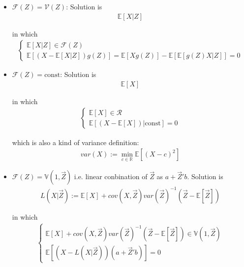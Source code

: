 \begin{itemize}[topsep=2pt,itemsep=0pt]
    \item $ \mathscr{F}(Z)=\mathscr{V}(Z) $: Solution is 
    \begin{align}
        \mathbb{E}\left[ X|Z \right] 
    \end{align}
    
    in which
    \begin{align}
        \begin{cases}
            \mathbb{E}\left[ X|Z \right] \in\mathscr{F}(Z)\\
            \mathbb{E}\left[(X-\mathbb{E}\left[ X|Z \right] )g(Z) \right]=\mathbb{E}\left[ Xg(Z) \right] -\mathbb{E}\left[ \mathbb{E}\left[ g(Z)X|Z \right]  \right] =0 
        \end{cases} 
    \end{align}
    \item $ \mathscr{F}(Z)=\mathrm{const} $: Solution is
    \begin{align}
         \mathbb{E}\left[ X \right]  
    \end{align}
    
    in which
    \begin{align}
        \begin{cases}
            \mathbb{E}\left[ X \right]\in \mathcal{R}\\
            \mathbb{E}\left[ (X-\mathbb{E}\left[ X \right] )\big| \mathrm{const} \right]=0 
        \end{cases} 
    \end{align}

    which is also a kind of variance definition:
    \begin{align}
        var(X):=\min_{c\in\mathbb{R}}\mathbb{E}\left[ (X-c)^2 \right]  
    \end{align}
    
    \item \hypertarget{MMSELinear}{}$ \mathscr{F}(Z)=\mathbb{V}(1,\vec{Z}) $ i.e. linear conbination of $ \vec{Z} $ as $ a+\vec{Z}'b $. Solution is
    \begin{align}
        L(X|\vec{Z}):=\mathbb{E}\left[ X \right] +cov(X,\vec{Z})var(\vec{Z})^{-1}\left(\vec{Z}-\mathbb{E}\left[ \vec{Z} \right] \right)
    \end{align}
    
    in which
    \begin{align}
        \begin{cases}
            \mathbb{E}\left[ X \right] +cov(X,\vec{Z})var(\vec{Z})^{-1}\left(\vec{Z}-\mathbb{E}\left[ \vec{Z} \right] \right)\in \mathbb{V}(1,\vec{Z})\\
        \mathbb{E}\left[ (X-L(X|\vec{Z}))(a+\vec{Z}'b) \right] = 0
        \end{cases}
    \end{align}
    
\end{itemize}


